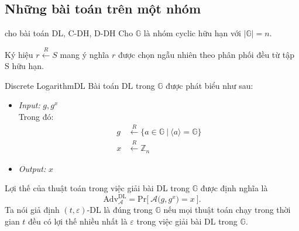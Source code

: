 \documentclass[class=report, crop=false]{standalone}
\begin{document}
		\subsection{Những bài toán trên một nhóm}
			\begin{supposition}{cho bài toán DL, C-DH, D-DH}
				Cho $\mathbb{G}$ là nhóm cyclic hữu hạn với $|\mathbb{G}| = n$.
			\end{supposition}
			Ký hiệu \hspace{1ex} $r \xleftarrow{R} S$ \hspace{1ex} mang ý nghĩa $r$ được chọn ngẫu nhiên theo phân phối đều từ tập S hữu hạn.
			\begin{problem}{Discrete Logarithm}{DL}
				Bài toán DL trong $\mathbb{G}$ được phát biểu như sau:
				\vspace{-\baselineskip}
				\begin{itemize}[leftmargin=1.5cm, itemindent=-0.5cm]
					\item[] \textit{Input:} $g, g^x$ \\
					Trong đó: \vspace{-\baselineskip}
					\begin{align*}
						g &\xleftarrow{R} \{ a \in \mathbb{G}\ | \ \langle a \rangle = \mathbb{G} \} \\
						x &\xleftarrow{R} \mathbb{Z}_n
					\end{align*}
					\item[] \textit{Output:} $x$
				\end{itemize}
				\vspace{-\baselineskip}\par
				Lợi thế của thuật toán \algo trong việc giải bài DL trong $\mathbb{G}$ được định nghĩa là
				\[
					\text{Adv}_{\mathcal{A}}^{\text{DL}} = \text{Pr}\bigg[ \ \mathcal{A}\Big(g, g^x \Big) = x \ \bigg].
				\] \indent
				Ta nói giả định $(t, \varepsilon)$-DL là đúng trong $\mathbb{G}$ nếu mọi thuật toán chạy trong thời gian $t$ đều có lợi thế nhiều nhất là $\varepsilon$ trong việc giải bài DL trong $\mathbb{G}$.
			\end{problem}
\end{document}
